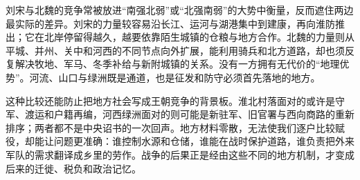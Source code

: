 刘宋与北魏的竞争常被放进“南强北弱”或“北强南弱”的大势中衡量，反而遮住两边最实际的差异。刘宋的力量较容易沿长江、运河与湖港集中到建康，再向淮防推出；它在北岸停留得越久，越要依靠陌生城镇的仓粮与地方合作。北魏的力量则从平城、并州、关中和河西的不同节点向外扩展，能利用骑兵和北方道路，却也须反复解决牧地、军马、冬季补给与新附城镇的关系。没有一方拥有无代价的“地理优势”。河流、山口与绿洲既是通道，也是征发和防守必须首先落地的地方。

这种比较还能防止把地方社会写成王朝竞争的背景板。淮北村落面对的或许是守军、渡运和户籍再编，河西绿洲面对的则可能是新驻军、旧官署与西向商路的重新排序；两者都不是中央诏书的一次回声。地方材料零散，无法使我们逐户比较赋役，却能让问题更准确：谁控制水源和仓储，谁能在战时保护道路，谁负责把外来军队的需求翻译成乡里的劳作。战争的后果正是经由这些不同的地方机制，才变成后来的迁徙、税负和政治记忆。
